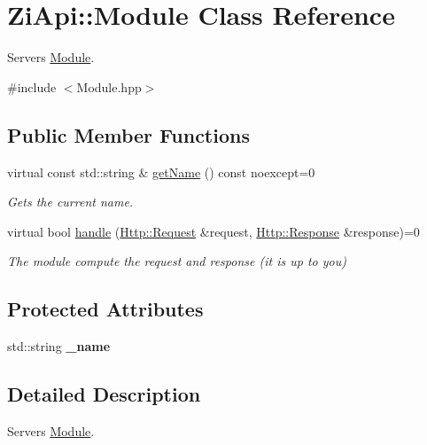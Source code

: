 \hypertarget{classZiApi_1_1Module}{}\section{Zi\+Api\+::Module Class Reference}
\label{classZiApi_1_1Module}


Server\textquotesingle{}s \mbox{\hyperlink{classZiApi_1_1Module}{Module}}.  




{\ttfamily \#include $<$Module.\+hpp$>$}

\subsection*{Public Member Functions}
\begin{DoxyCompactItemize}
\item 
\mbox{\label{classZiApi_1_1Module_a57b48f9d16a42034e2aa172df911e371}} 
virtual const std\+::string \& \mbox{\hyperlink{classZiApi_1_1Module_a57b48f9d16a42034e2aa172df911e371}{get\+Name}} () const noexcept=0
\begin{DoxyCompactList}\small\item\em Gets the current name. \end{DoxyCompactList}\item 
virtual bool \mbox{\hyperlink{classZiApi_1_1Module_a36a4a400a44f883262123e7a0ec2778f}{handle}} (\mbox{\hyperlink{classHttp_1_1Request}{Http\+::\+Request}} \&request, \mbox{\hyperlink{classHttp_1_1Response}{Http\+::\+Response}} \&response)=0
\begin{DoxyCompactList}\small\item\em The module compute the request and response (it is up to you) \end{DoxyCompactList}\end{DoxyCompactItemize}
\subsection*{Protected Attributes}
\begin{DoxyCompactItemize}
\item 
\mbox{\label{classZiApi_1_1Module_a2b53b4057d16cabf14027f5fe777a147}} 
std\+::string {\bfseries \+\_\+name}
\end{DoxyCompactItemize}


\subsection{Detailed Description}
Server\textquotesingle{}s \mbox{\hyperlink{classZiApi_1_1Module}{Module}}. 

